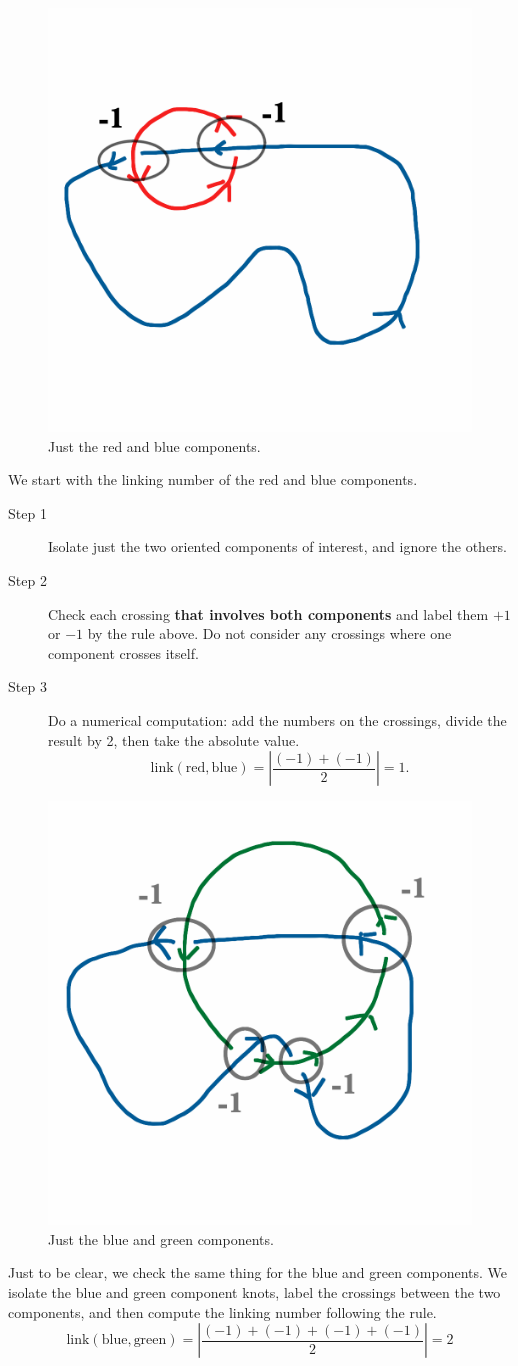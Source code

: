 \documentclass[12pt,letterpaper]{article}
\theoremstyle{definition}
\begin{document}
\begin{figure}
    \centering
    \includegraphics[width=.3\textwidth]{knotpics/rb.png}
    \caption{Just the red and blue components.}
    \vspace{-60pt}
\end{figure}
We start with the linking number of the red and blue components.
\begin{description}
\item[Step 1] Isolate just the two oriented components of interest, and ignore the others.

\item[Step 2] Check each crossing \textbf{that involves both components} and label them $+1$ or $-1$ by the rule above. Do not consider any crossings where one component crosses itself.
\item[Step 3] Do a numerical computation: add the numbers on the crossings, divide the result by 2, then take the absolute value.
\[ 
\mathrm{link}(\text{red}, \text{blue}) = \left| \dfrac{(-1)+(-1)}{2}\right| = 1.
\]
\end{description}


\begin{figure}
    \centering
    \includegraphics[width=.3\textwidth]{knotpics/bg.png}
    \caption{Just the blue and green components.}
\end{figure}

\vspace{1in}

Just to be clear, we check the same thing for the blue and green components.
We isolate the blue and green component knots, label the crossings between the two components, and then compute the linking number following the rule.
\[
\mathrm{link}(\text{blue},\text{green}) = \left| \dfrac{ (-1)+(-1)+(-1)+(-1)}{2}\right| = 2
\]
\end{document}
